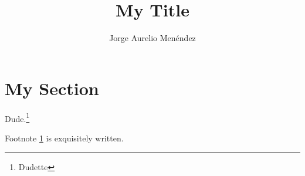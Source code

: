 \documentclass[a4paper]{article}
\title{My Title}
\author{Jorge Aurelio Men\'endez}
\begin{document}
\maketitle
\tableofcontents

\section{My Section}
Dude.\footnote{Dudette\label{myfootnote}}

Footnote \ref{myfootnote} is exquisitely written.

% 
% 
\end{document}
